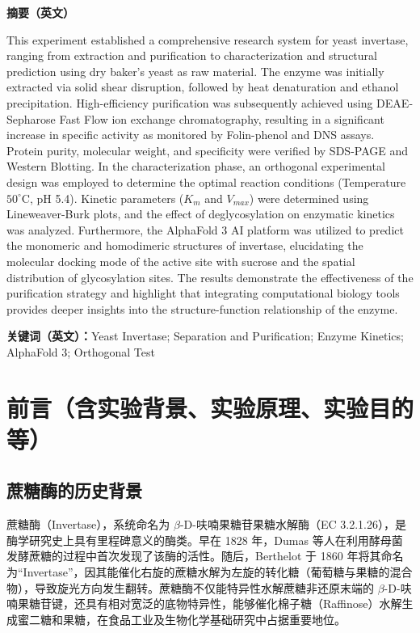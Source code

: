 \documentclass[10.5pt, a4paper]{ctexart}
\begin{document}
\noindent\textbf{摘要（英文）}

This experiment established a comprehensive research system for yeast invertase, ranging from extraction and purification to characterization and structural prediction using dry baker's yeast as raw material. The enzyme was initially extracted via solid shear disruption, followed by heat denaturation and ethanol precipitation. High-efficiency purification was subsequently achieved using DEAE-Sepharose Fast Flow ion exchange chromatography, resulting in a significant increase in specific activity as monitored by Folin-phenol and DNS assays. Protein purity, molecular weight, and specificity were verified by SDS-PAGE and Western Blotting. In the characterization phase, an orthogonal experimental design was employed to determine the optimal reaction conditions (Temperature $50^{\circ}\text{C}$, pH 5.4). Kinetic parameters ($K_m$ and $V_{max}$) were determined using Lineweaver-Burk plots, and the effect of deglycosylation on enzymatic kinetics was analyzed. Furthermore, the AlphaFold 3 AI platform was utilized to predict the monomeric and homodimeric structures of invertase, elucidating the molecular docking mode of the active site with sucrose and the spatial distribution of glycosylation sites. The results demonstrate the effectiveness of the purification strategy and highlight that integrating computational biology tools provides deeper insights into the structure-function relationship of the enzyme.

\vspace{1em}

\noindent\textbf{关键词（英文）：}\hspace{1em}Yeast Invertase; Separation and Purification; Enzyme Kinetics; AlphaFold 3; Orthogonal Test


\section{前言（含实验背景、实验原理、实验目的等）}
\subsection{蔗糖酶的历史背景}
蔗糖酶（Invertase），系统命名为 $\beta$-D-呋喃果糖苷果糖水解酶（EC 3.2.1.26），是酶学研究史上具有里程碑意义的酶类。早在 1828 年，Dumas 等人在利用酵母菌发酵蔗糖的过程中首次发现了该酶的活性。随后，Berthelot 于 1860 年将其命名为“Invertase”，因其能催化右旋的蔗糖水解为左旋的转化糖（葡萄糖与果糖的混合物），导致旋光方向发生翻转。蔗糖酶不仅能特异性水解蔗糖非还原末端的 $\beta$-D-呋喃果糖苷键，还具有相对宽泛的底物特异性，能够催化棉子糖（Raffinose）水解生成蜜二糖和果糖，在食品工业及生物化学基础研究中占据重要地位。
\end{document}
